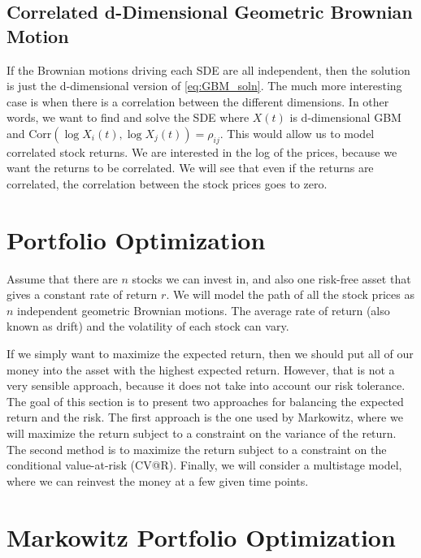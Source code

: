 \documentclass{amsart}
\theoremstyle{definition}
\theoremstyle{remark}
\begin{document}
\subsection{Correlated d-Dimensional Geometric Brownian Motion}\label{corr_gmb}
If the Brownian motions driving each SDE are all independent, then the solution is just the d-dimensional version of \eqref{eq:GBM_soln}. The much more interesting case is when there is a correlation between the different dimensions. In other words, we want to find and solve the SDE where $X(t)$ is d-dimensional GBM and $\text{Corr}(\log X_i(t), \log X_j(t)) = \rho_{ij}$. This would allow us to model correlated stock returns. We are interested in the log of the prices, because we want the returns to be correlated. We will see that even if the returns are correlated, the correlation between the stock prices goes to zero.

\section{Portfolio Optimization}
Assume that there are $n$ stocks we can invest in, and also one risk-free asset that gives a constant rate of return $r$. We will model the path of all the stock prices as $n$ independent geometric Brownian motions. The average rate of return (also known as drift) and the volatility of each stock can vary.

If we simply want to maximize the expected return, then we should put all of our money into the asset with the highest expected return. However, that is not a very sensible approach, because it does not take into account our risk tolerance. The goal of this section is to present two approaches for balancing the expected return and the risk. The first approach is the one used by Markowitz, where we will maximize the return subject to a constraint on the variance of the return. The second method is to maximize the return subject to a constraint on the conditional value-at-risk (CV@R). Finally, we will consider a multistage model, where we can reinvest the money at a few given time points.

\section{Markowitz Portfolio Optimization}
\end{document}
